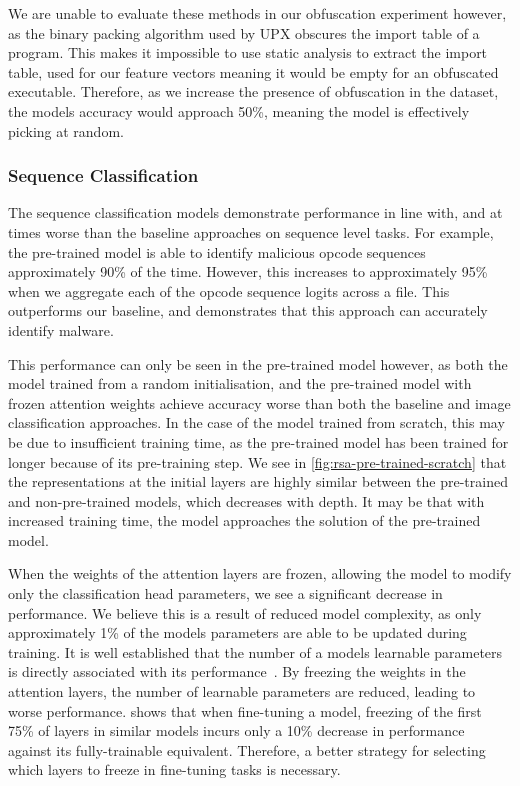 \documentclass[main.tex]{subfiles}
\begin{document}
We are unable to evaluate these methods in our obfuscation experiment however, as the binary packing algorithm used by UPX obscures the import table of a program. This makes it impossible to use static analysis to extract the import table, used for our feature vectors meaning it would be empty for an obfuscated executable. Therefore, as we increase the presence of obfuscation in the dataset, the models accuracy would approach 50\%, meaning the model is effectively picking at random.

\subsubsection{Sequence Classification}

The sequence classification models demonstrate performance in line with, and at times worse than the baseline approaches on sequence level tasks. For example, the pre-trained model is able to identify malicious opcode sequences approximately 90\% of the time. However, this increases to approximately 95\% when we aggregate each of the opcode sequence logits across a file. This outperforms our baseline, and demonstrates that this approach can accurately identify malware. 

This performance can only be seen in the pre-trained model however, as both the model trained from a random initialisation, and the pre-trained model with frozen attention weights achieve accuracy worse than both the baseline and image classification approaches. In the case of the model trained from scratch, this may be due to insufficient training time, as the pre-trained model has been trained for longer because of its pre-training step. We see in \cref{fig:rsa-pre-trained-scratch} that the representations at the initial layers are highly similar between the pre-trained and non-pre-trained models, which decreases with depth. It may be that with increased training time, the model approaches the solution of the pre-trained model. 

When the weights of the attention layers are frozen, allowing the model to modify only the classification head parameters, we see a significant decrease in performance. We believe this is a result of reduced model complexity, as only approximately 1\% of the models parameters are able to be updated during training. It is well established that the number of a models learnable parameters is directly associated with its performance~\citep{kaplanScalingLawsNeural2020}. By freezing the weights in the attention layers, the number of learnable parameters are reduced, leading to worse performance. \citep{leeWhatWouldElsa2019} shows that when fine-tuning a model, freezing of the first 75\% of layers in similar models incurs only a 10\% decrease in performance against its fully-trainable equivalent. Therefore, a better strategy for selecting which layers to freeze in fine-tuning tasks is necessary. 
\end{document}
